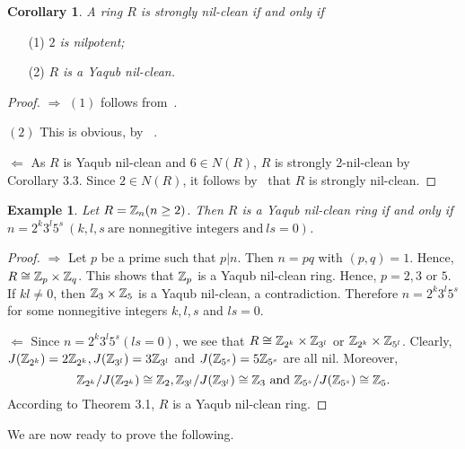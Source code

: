 \documentclass[12pt, reqno]{amsart}
\newtheorem{cor}[thm]{Corollary}
\newtheorem{exam}[thm]{Example}
\numberwithin{equation}{section}
\begin{document}
\begin{cor} A ring $R$ is strongly nil-clean if and only if\end{cor}
\begin{enumerate}
\item [(1)] {\it $2$ is nilpotent;}
\vspace{-.5mm}
\item [(2)] {\it $R$ is a Yaqub nil-clean.}
\end{enumerate}
\begin{proof} $\Longrightarrow$ $(1)$ follows from~\cite[Proposition 3.14]{D}.

$(2)$ This is obvious, by ~\cite[Corollary 2.5]{KWZ}.

$\Longleftarrow$ As $R$ is Yaqub nil-clean and $6\in N(R)$, $R$ is strongly 2-nil-clean by Corollary 3.3. Since $2\in N(R)$, it follows by~\cite[Theorem 2.11]{CS} that $R$ is strongly nil-clean.\end{proof}

\begin{exam} Let $R={\Bbb Z_n} (n\geq 2)$. Then $R$ is a Yaqub nil-clean ring if and only if $n=2^k3^l5^s~ (k,l,s~\mbox{are nonnegitive integers and}~ ls=0)$.\end{exam}
\begin{proof} $\Longrightarrow$ Let $p$ be a prime such that $p|n$. Then $n=pq$ with $(p,q)=1$. Hence, $R\cong {\Bbb Z}_p\times {\Bbb Z}_q$.
This shows that ${\Bbb Z}_p$ is a Yaqub nil-clean ring. Hence, $p=2,3$ or $5$. If $kl\neq 0$, then ${\Bbb Z}_{3}\times {\Bbb Z}_5$ is a Yaqub nil-clean, a contradiction. Therefore $n=2^k3^l5^s$ for some nonnegitive integers $k,l,s$ and $ls=0$.

$\Longleftarrow$ Since $n=2^k3^l5^s (ls=0)$, we see that $R\cong {\Bbb Z}_{2^k}\times{\Bbb Z}_{3^l}$ or ${\Bbb Z}_{2^k}\times{\Bbb Z}_{5^l}$. Clearly,
$J({\Bbb Z}_{2^k})=2{\Bbb Z}_{2^k}, J({\Bbb Z}_{3^l})=3{\Bbb Z}_{3^l}$ and $J({\Bbb Z}_{5^s})=5{\Bbb Z}_{5^s}$ are all nil. Moreover, $${\Bbb Z}_{2^k}/J({\Bbb Z}_{2^k})\cong {\Bbb Z}_2, {\Bbb Z}_{3^l}/J({\Bbb Z}_{3^l})\cong {\Bbb Z}_3~\mbox{and}~{\Bbb Z}_{5^s}/J({\Bbb Z}_{5^s})\cong {\Bbb Z}_5.$$ According to
Theorem 3.1, $R$ is a Yaqub nil-clean ring.\end{proof}

We are now ready to prove the following.
\end{document}
